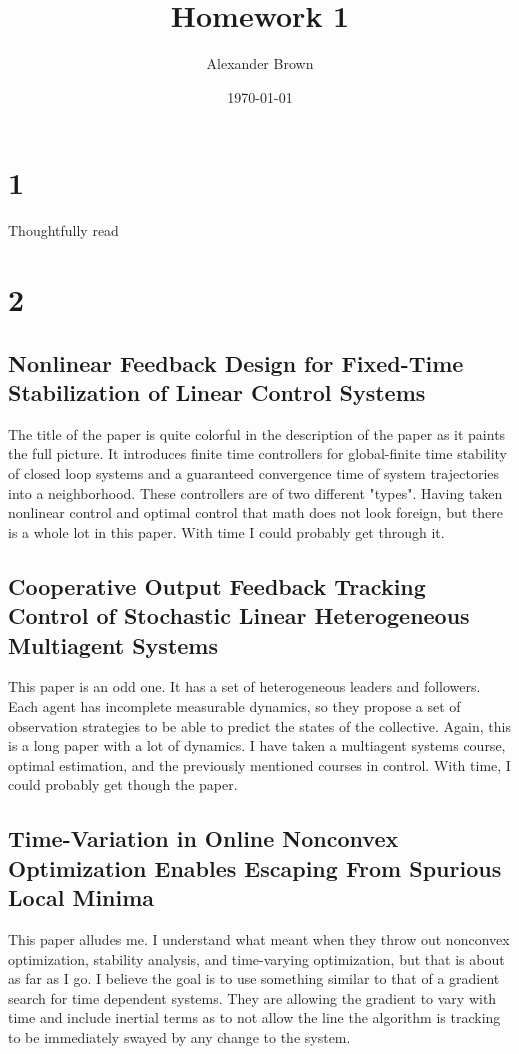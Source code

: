 \documentclass[11pt,a4paper,final]{article}
\author{Alexander Brown}
\date{\today}
\title{Homework 1}
\begin{document}
\maketitle
\setcounter{secnumdepth}{-1}

\parskip 3mm                                %
\let\ref\autoref                            %

\section{1}
\label{sec:org0c71b5b}
Thoughtfully read

\section{2}
\label{sec:org09c0061}

\subsection{Nonlinear Feedback Design for Fixed-Time Stabilization of Linear Control Systems}
\label{sec:org89c7237}
The title of the paper is quite colorful in the description of the paper as it paints the full picture. It introduces
finite time controllers for global-finite time stability of closed loop systems and a guaranteed convergence time of
system trajectories into a neighborhood. These controllers are of two different "types". Having taken nonlinear control
and optimal control that math does not look foreign, but there is a whole lot in this paper. With time I could probably
get through it.

\subsection{Cooperative Output Feedback Tracking Control of Stochastic Linear Heterogeneous Multiagent Systems}
\label{sec:org3fc276e}
This paper is an odd one. It has a set of heterogeneous leaders and followers. Each agent has incomplete
measurable dynamics, so they propose a set of observation strategies to be able to predict the states of the collective.
Again, this is a long paper with a lot of dynamics. I have taken a multiagent systems course, optimal estimation, and
the previously mentioned courses in control. With time, I could probably get though the paper.

\subsection{Time-Variation in Online Nonconvex Optimization Enables Escaping From Spurious Local Minima}
\label{sec:orgc7b1f5f}
This paper alludes me. I understand what meant when they throw out nonconvex optimization, stability analysis, and
time-varying optimization, but that is about as far as I go. I believe the goal is to use something similar to that of a
gradient search for time dependent systems. They are allowing the gradient to vary with time and include inertial terms
as to not allow the line the algorithm is tracking to be immediately swayed by any change to the system.
\end{document}
